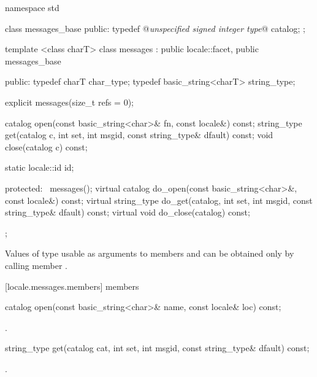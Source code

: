 %
\begin{codeblock}
namespace std {
  class messages_base {
  public:
    typedef @\textit{unspecified signed integer type}@ catalog;
  };

  template <class charT>
  class messages : public locale::facet, public messages_base {
  public:
    typedef charT char_type;
    typedef basic_string<charT> string_type;

    explicit messages(size_t refs = 0);

    catalog open(const basic_string<char>& fn, const locale&) const;
    string_type get(catalog c, int set, int msgid,
                     const string_type& dfault) const;
    void close(catalog c) const;

    static locale::id id;

  protected:
    ~messages();
    virtual catalog do_open(const basic_string<char>&, const locale&) const;
    virtual string_type do_get(catalog, int set, int msgid,
                               const string_type& dfault) const;
    virtual void do_close(catalog) const;
  };
}
\end{codeblock}

\pnum
Values of type
usable as arguments to members
and
can be obtained only by calling member
.

[locale.messages.members]{ members}

%
%
\begin{itemdecl}
catalog open(const basic_string<char>& name, const locale& loc) const;
\end{itemdecl}

\begin{itemdescr}
\pnum
\returns
{}.
\end{itemdescr}

%
%
\begin{itemdecl}
string_type get(catalog cat, int set, int msgid,
                const string_type& dfault) const;
\end{itemdecl}

\begin{itemdescr}
\pnum
\returns
{}.
\end{itemdescr}

